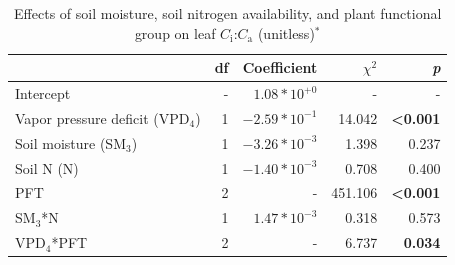 \newpage
\begin{table}
    \centering
    \caption[Effects of soil moisture, soil nitrogen availability, and plant functional group on leaf $C_\mathrm{i}$:$C_\mathrm{a}$]{Effects of soil moisture, soil nitrogen availability, and plant functional group on leaf $C_\mathrm{i}$:$C_\mathrm{a}$ (unitless)$^*$}
        \begin{tabular}{p{6cm}p{0.5cm}p{2cm}p{1.5cm}p{1.5cm}}
            \hline 
            & \multicolumn{1}{r}{df} 
            & \multicolumn{1}{r}{Coefficient} 
            & \multicolumn{1}{r}{$\chi^{2}$} 
            & \multicolumn{1}{r}{\textit{p}} 
            \\ 
            \hline
            
            Intercept
            & \multicolumn{1}{r}{-}
            & \multicolumn{1}{r}{$1.08*10^{+0}$}
            & \multicolumn{1}{r}{-}
            & \multicolumn{1}{r}{-}
            \\

            Vapor pressure deficit (VPD$_4$)
            & \multicolumn{1}{r}{1}
            & \multicolumn{1}{r}{$-2.59*10^{-1}$}
            & \multicolumn{1}{r}{14.042}
            & \multicolumn{1}{r}{\textbf{<0.001}}
            \\

            Soil moisture (SM$_{3}$)
            & \multicolumn{1}{r}{1}
            & \multicolumn{1}{r}{$-3.26*10^{-3}$}
            & \multicolumn{1}{r}{1.398}
            & \multicolumn{1}{r}{0.237}
            \\

            Soil N (N)
            & \multicolumn{1}{r}{1}
            & \multicolumn{1}{r}{$-1.40*10^{-3}$}
            & \multicolumn{1}{r}{0.708}
            & \multicolumn{1}{r}{0.400}
            \\

            PFT
            & \multicolumn{1}{r}{2}
            & \multicolumn{1}{r}{-}
            & \multicolumn{1}{r}{451.106}
            & \multicolumn{1}{r}{\textbf{<0.001}}
            \\

            SM$_{3}$*N
            & \multicolumn{1}{r}{1}
            & \multicolumn{1}{r}{$1.47*10^{-3}$}
            & \multicolumn{1}{r}{0.318}
            & \multicolumn{1}{r}{0.573}
            \\

            VPD$_{4}$*PFT
            & \multicolumn{1}{r}{2}
            & \multicolumn{1}{r}{-}
            & \multicolumn{1}{r}{6.737}
            & \multicolumn{1}{r}{\textbf{0.034}}
            \\


\end{tabular}
\end{table}
